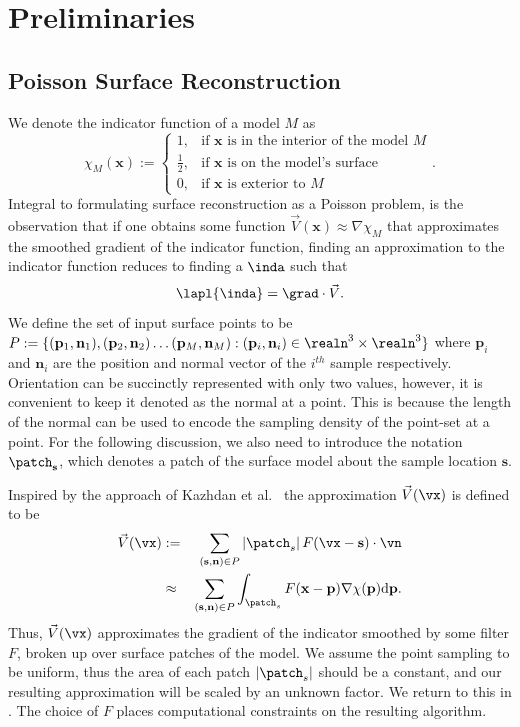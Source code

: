 \section{Preliminaries}\label{sec:pois_review}
\subsection{Poisson Surface Reconstruction}
We denote the indicator function of a model $M$ as $$ \chi_M(\mathbf{x}) :=
\begin{cases}
1, & \text{if }\mathbf{x}\text{ is in the interior of the model } M \\
\frac{1}{2}, & \text{if } \mathbf{x}\text{ is on the model's surface}\\
0, & \text{if }\mathbf{x}\text{ is exterior to } M
\end{cases}. $$
Integral to formulating surface reconstruction as a Poisson problem, is the observation that if one obtains some function $\vec{V}(\mathbf{x})\approx{\nabla}\chi_M$ that approximates the smoothed gradient of the indicator function, finding an approximation to the indicator function reduces to finding a $\inda$ such that {\small 
\begin{equation} \label{eq:poisson}
	\lapl{\inda} = {\grad} \cdot \vec{V}.
\end{equation}}
We define the set of input surface points to be $P:=\{(\mathbf{p}_1,\mathbf{n}_1), (\mathbf{p}_2,\mathbf{n}_2) \hdots (\mathbf{p}_M,\mathbf{n}_M) : (\mathbf{p}_i,\mathbf{n}_i) \in
\realn^3 \times \realn^3 \}$ where $\mathbf{p}_i$ and $\mathbf{n}_i$ are the position and normal vector of the $i^{th}$ sample respectively. Orientation can be succinctly represented with only two values, however, it is convenient to keep it denoted as the normal at a point. This is because the length of the normal can be used to encode the sampling density of the point-set at a point. For the following discussion, we also need to introduce the notation $\patch_{\mathbf{s}}$, which denotes a patch of the surface model about the sample location $\mathbf{s}$. 

Inspired by the approach of Kazhdan et al.~\cite{Kazhdan06} the approximation $\vec{V}(\vx)$ is defined to be  {\small 
\begin{eqnarray}
	\vec{V}(\vx) & := & \sum_{(\mathbf{s},\mathbf{n}) \in P}\left|\patch_s\right|F(\vx-\mathbf{s})\cdot\vn \label{eq:vdef} \\
	 & \approx & \sum_{(\mathbf{s},\mathbf{n}) \in P} \int_{\patch_s}{F(\mathbf{x} - \mathbf{p}) \nabla \chi (\mathbf{p})} \mathrm{d} \mathbf{p}. \notag  
\end{eqnarray}}
Thus, $\vec{V}(\vx)$ approximates the gradient of the indicator smoothed by some filter $F$, broken up over surface patches of the model. We assume the point sampling to be uniform, thus the area of each patch $\left|\patch_s\right|$ should be a constant, and our resulting approximation will be scaled by an unknown factor. We return to this in . The choice of $F$ places computational constraints on the resulting algorithm.

